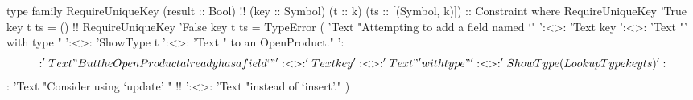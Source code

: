 \begin{code}
type family RequireUniqueKey
      (result :: Bool)  !!
      (key :: Symbol)
      (t :: k)
      (ts :: [(Symbol, k)]) :: Constraint where
  RequireUniqueKey 'True  key t ts = ()  !!
  RequireUniqueKey 'False key t ts =
    TypeError
         ( 'Text "Attempting to add a field named `"
     ':<>: 'Text key
     ':<>: 'Text "' with type "
     ':<>: 'ShowType t
     ':<>: 'Text " to an OpenProduct."
     ':$$: 'Text "But the OpenProduct already has a field `"
     ':<>: 'Text key
     ':<>: 'Text "' with type "
     ':<>: 'ShowType (LookupType key ts)
     ':$$: 'Text "Consider using `update' "  !!
     ':<>: 'Text "instead of `insert'."
         )
\end{code}
